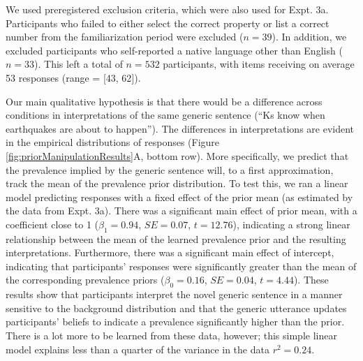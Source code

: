 \documentclass[floatsintext,doc]{apa6}
\theoremstyle{definition}
\theoremstyle{definition}
\theoremstyle{definition}
\theoremstyle{remark}
\begin{document}
We used preregistered exclusion criteria, which were also used for Expt.
3a. Participants who failed to either select the correct property or
list a correct number from the familiarization period were excluded
(\(n = 39\)). In addition, we excluded participants who self-reported a
native language other than English (\(n = 33\)). This left a total of
\(n = 532\) participants, with items receiving on average 53 responses
(range = {[}43, 62{]}).

Our main qualitative hypothesis is that there would be a difference
across conditions in interpretations of the same generic sentence
(\enquote{Ks know when earthquakes are about to happen}). The
differences in interpretations are evident in the empirical
distributions of responses (Figure \ref{fig:priorManipulationResults}A,
bottom row). More specifically, we predict that the prevalence implied
by the generic sentence will, to a first approximation, track the mean
of the prevalence prior distribution. To test this, we ran a linear
model predicting responses with a fixed effect of the prior mean (as
estimated by the data from Expt. 3a). There was a significant main
effect of prior mean, with a coefficient close to 1 (\(\beta_1 = 0.94\),
\(SE=0.07\), \(t = 12.76\)), indicating a strong linear relationship
between the mean of the learned prevalence prior and the resulting
interpretations. Furthermore, there was a significant main effect of
intercept, indicating that participants' responses were significantly
greater than the mean of the corresponding prevalence priors
(\(\beta_0 = 0.16\), \(SE=0.04\), \(t = 4.44\)). These results show that
participants interpret the novel generic sentence in a manner sensitive
to the background distribution and that the generic utterance updates
participants' beliefs to indicate a prevalence significantly higher than
the prior. There is a lot more to be learned from these data, however;
this simple linear model explains less than a quarter of the variance in
the data \(r^2 = 0.24\).
\end{document}

